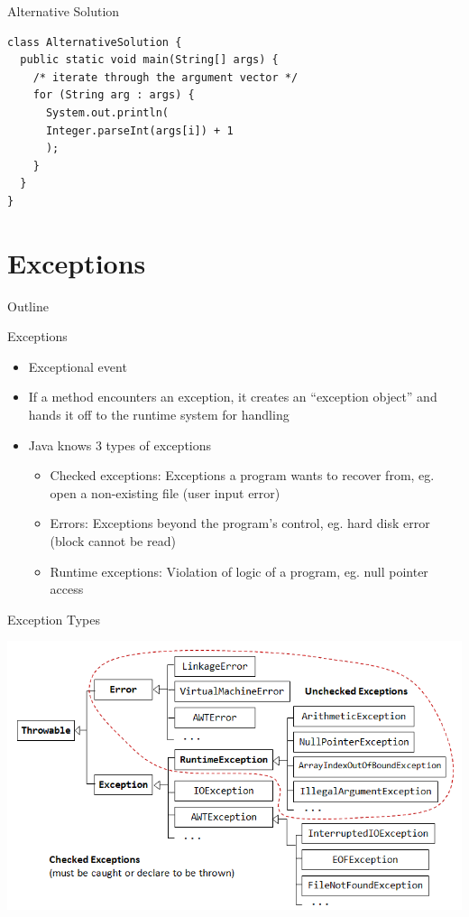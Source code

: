 \begin{frame}[fragile]{Alternative Solution}
  \begin{lstlisting}
class AlternativeSolution {
  public static void main(String[] args) {
    /* iterate through the argument vector */
    for (String arg : args) {		
      System.out.println(
      Integer.parseInt(args[i]) + 1
      );
    }
  } 		
}
  \end{lstlisting}
\end{frame}


\section{Exceptions}

\begin{frame}{Outline}
  \tableofcontents[current]
\end{frame}

\begin{frame}{Exceptions}
  \begin{itemize}
  \item Exceptional event
  \item If a method encounters an exception, it creates an ``exception
    object'' and hands it off to the runtime system for handling
  \item Java knows 3 types of exceptions
    \begin{itemize}
    \item Checked exceptions: Exceptions a program wants to recover
      from, eg. open a non-existing file (user input error)
    \item Errors: Exceptions beyond the program's control, eg. hard
      disk error (block cannot be read)
    \item Runtime exceptions: Violation of logic of a program,
      eg. null pointer access
    \end{itemize}
  \end{itemize}
\end{frame}

\begin{frame}{Exception Types}
  \begin{center}
    \includegraphics[width=\textwidth]{figures/exception-classes}
  \end{center}  
\end{frame}


